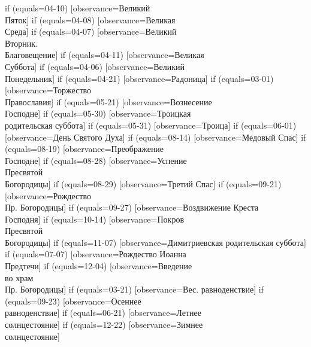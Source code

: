 {  if (equals=04-10) [observance=Великий\\ Пяток]
  if (equals=04-08) [observance=Великая\\ Среда]
  if (equals=04-07) [observance=Великий\\ Вторник.\\ Благовещение]
  if (equals=04-11) [observance=Великая\\ Суббота]
  if (equals=04-06) [observance=Великий\\ Понедельник]
  if (equals=04-21) [observance=Радоница]
  if (equals=03-01) [observance=Торжество\\ Православия]
  if (equals=05-21) [observance=Вознесение\\ Господне]
  if (equals=05-30) [observance=Троицкая\\ родительская суббота]
  if (equals=05-31) [observance=Троица]
  if (equals=06-01) [observance=День Святого Духа]
  if (equals=08-14) [observance=Медовый Спас]
  if (equals=08-19) [observance=Преображение\\ Господне]
  if (equals=08-28) [observance=Успение\\ Пресвятой\\ Богородицы]
  if (equals=08-29) [observance=Третий Спас]
  if (equals=09-21) [observance=Рождество\\ Пр. Богородицы]
  if (equals=09-27) [observance=Воздвижение Креста\\ Господня]
  if (equals=10-14) [observance=Покров\\ Пресвятой\\ Богородицы]
  if (equals=11-07) [observance=Димитриевская родительская суббота]
  if (equals=07-07) [observance=Рождество Иоанна\\ Предтечи]
  if (equals=12-04) [observance=Введение\\ во храм\\ Пр. Богородицы]
  if (equals=03-21) [observance=Вес. равноденствие]
  if (equals=09-23) [observance=Осеннее\\ равноденствие]
  if (equals=06-21) [observance=Летнее\\ солнцестояние]
  if (equals=12-22) [observance=Зимнее\\ солнцестояние]
}

